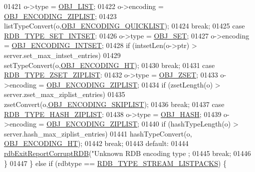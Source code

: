 \begin{DoxyCode}
{{{{{{{{{{{{{{{{{{{{{{{01421                 o->type = \hyperlink{server_8h_a4a5f22a280949c97a0cb0d4213275126}{OBJ\_LIST};
01422                 o->encoding = \hyperlink{server_8h_aabf064ede983103f1fd0df2086e84eee}{OBJ\_ENCODING\_ZIPLIST};
01423                 listTypeConvert(o,\hyperlink{server_8h_aec792aeed6d4bf83966672e6a23043b8}{OBJ\_ENCODING\_QUICKLIST});
01424                 \textcolor{keywordflow}{break};
01425             \textcolor{keywordflow}{case} \hyperlink{rdb_8h_a0a267bc10fe879463d503d5182865b86}{RDB\_TYPE\_SET\_INTSET}:
01426                 o->type = \hyperlink{server_8h_a8d179375a4aac33d3fa7aa80c8ccc75f}{OBJ\_SET};
01427                 o->encoding = \hyperlink{server_8h_a214173987de21c3b7661fddd42b05873}{OBJ\_ENCODING\_INTSET};
01428                 \textcolor{keywordflow}{if} (intsetLen(o->ptr) > server.set\_max\_intset\_entries)
01429                     setTypeConvert(o,\hyperlink{server_8h_a9c10219f68afc557d510d108257d238b}{OBJ\_ENCODING\_HT});
01430                 \textcolor{keywordflow}{break};
01431             \textcolor{keywordflow}{case} \hyperlink{rdb_8h_a844a39336653d28b5a222404cb4a5bd2}{RDB\_TYPE\_ZSET\_ZIPLIST}:
01432                 o->type = \hyperlink{server_8h_a8c356422ddbc03bd77694880a30a1953}{OBJ\_ZSET};
01433                 o->encoding = \hyperlink{server_8h_aabf064ede983103f1fd0df2086e84eee}{OBJ\_ENCODING\_ZIPLIST};
01434                 \textcolor{keywordflow}{if} (zsetLength(o) > server.zset\_max\_ziplist\_entries)
01435                     zsetConvert(o,\hyperlink{server_8h_acfb35db5cb30ed113ed23aeb1a224c4c}{OBJ\_ENCODING\_SKIPLIST});
01436                 \textcolor{keywordflow}{break};
01437             \textcolor{keywordflow}{case} \hyperlink{rdb_8h_af7ff565f65a30ccd4bf55f1503b63946}{RDB\_TYPE\_HASH\_ZIPLIST}:
01438                 o->type = \hyperlink{server_8h_a87c05ba4f7f36741864277f02a4423fb}{OBJ\_HASH};
01439                 o->encoding = \hyperlink{server_8h_aabf064ede983103f1fd0df2086e84eee}{OBJ\_ENCODING\_ZIPLIST};
01440                 \textcolor{keywordflow}{if} (hashTypeLength(o) > server.hash\_max\_ziplist\_entries)
01441                     hashTypeConvert(o, \hyperlink{server_8h_a9c10219f68afc557d510d108257d238b}{OBJ\_ENCODING\_HT});
01442                 \textcolor{keywordflow}{break};
01443             \textcolor{keywordflow}{default}:
01444                 \hyperlink{rdb_8c_afb34e310c0e5dfd9f8c2bebbec59c7f7}{rdbExitReportCorruptRDB}(\textcolor{stringliteral}{"Unknown RDB encoding type %
      ;
01445                 \textcolor{keywordflow}{break};
01446         \}
01447     \} \textcolor{keywordflow}{else} \textcolor{keywordflow}{if} (rdbtype == \hyperlink{rdb_8h_a6552781f513eb80def691fe64e90000c}{RDB\_TYPE\_STREAM\_LISTPACKS}) \{
}}}}}}}}}}}}}}}}}}}}}}}}
\end{DoxyCode}
